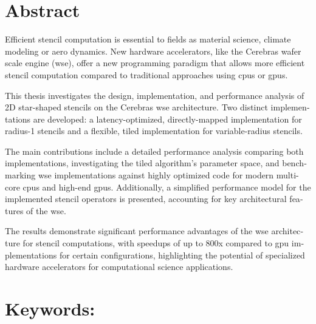 \begin{otherlanguage}{english}
\section*{Abstract}
Efficient stencil computation is essential to fields as material science, climate modeling or aero dynamics. New hardware accelerators, like the Cerebras wafer scale engine (\ac{wse}), offer a new programming paradigm that allows more efficient stencil computation compared to traditional approaches using \acp{cpu} or \acp{gpu}.

This thesis investigates the design, implementation, and performance analysis of 2D star-shaped stencils on the Cerebras \ac{wse} architecture. Two distinct implementations are developed: a latency-optimized, directly-mapped implementation for radius-1 stencils and a flexible, tiled implementation for variable-radius stencils. 

The main contributions include a detailed performance analysis comparing both implementations, investigating the tiled algorithm's parameter space, and benchmarking \ac{wse} implementations against highly optimized code for modern multi-core \acp{cpu} and high-end \acp{gpu}. Additionally, a simplified performance model for the implemented stencil operators is presented, accounting for key architectural features of the \ac{wse}.

The results demonstrate significant performance advantages of the \ac{wse} architecture for stencil computations, with speedups of up to 800x compared to \ac{gpu} implementations for certain configurations, highlighting the potential of specialized hardware accelerators for computational science applications.

\section*{Keywords:} \itshape \englishkeywords
\end{otherlanguage}